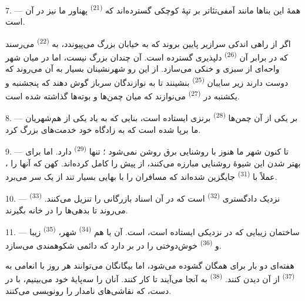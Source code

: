 7. --- همهٔ این بناها مانند آمفی‌تئاتر بر تپهٔ کوچکی گسترده‌اند که
 \textsuperscript{(21)} پهناور ما نیز در آن است.

اگر از راهی اندکی سرازیر پایین بروند که به خیابان بزرگ می‌پیوندد، به
 \textsuperscript{(22)} می‌رسند که در برابر آن
 \textsuperscript{(26)} دلپذیری گسترده است. آن
 چندان بزرگ نیست، اما در میان شهر واحه‌ای از سبزی و
خنکی می‌سازد. از این رو شهرنشینان بسیار به آن می‌روند که دوست دارند
زیر سایبان  \textsuperscript{(25)} بنشینند تا به
نوازندگان سرباز گوش دهند که پنجشنبه و یکشنبه در 
\textsuperscript{(27)} می‌نوازند که میان چمن‌ها و بوته‌ها گذاشته شده
است.

8. --- بر یکی از آن چمن‌ها  \textsuperscript{(28)}
برنزی ایستاده است، بنایی که به یاد یکی از هم‌شهریان ما برپا شده است که
به زادگاه خود خدمت‌های بزرگ کرد.

\VUsaut{4.0mm}
\VUsaut{3.4mm}

9. --- تا کنون شهر ما هنوز با روشنایی برق روشن نمی‌شود ؛ تنها
 \textsuperscript{(29)} دارد. اما
 برای بهتر شدن این شیوهٔ روشنایی مبارزه
می‌کنند،  از پیش  را
کامل کرده‌اند.  کهن که  آنها را
، عملاً با 
\textsuperscript{(31)} جایگزین شده‌اند که مسافران را با بهایی بسیار
 تند از یک سر  می‌برد.

10. --- نزدیک دادگستری  \textsuperscript{(32)} است که در
آن اسناد بازرگانی را تنزیل می‌کنند. 
\textsuperscript{(33)} می‌روند تا بدهی‌ها را در خانه بگیرند.

\VUsaut{4.0mm}
\VUsaut{3.4mm}

11. --- ساختمان زیبایی که در نزدیکی ایستاده است،  است.
آن با هم  \textsuperscript{(34)} شهر،
 \textsuperscript{(35)} زیبا و
 \textsuperscript{(36)} خوش‌دوختی را در بر دارد که
 دائمی شکوهمندی می‌سازد.

هفته‌ای دو بار برای همگان گشوده می‌شود، اما بیگانگان می‌توانند هر روز
با انعامی به  \textsuperscript{(37)} از آن دیدن کنند.
 \textsuperscript{(38)} به آنجا می‌آیند تا کار کنند.
آنان را  سه‌پایهٔ خود می‌بینیم، با 
در دست، که نقاشی‌های نامدار را رونویسی می‌کنند.

